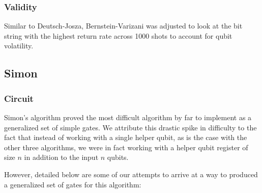 \documentclass[12pt]{article}
\begin{document}
\subsubsection*{Validity}
Similar to Deutsch-Josza, Bernstein-Varizani was adjusted to look at the bit string with the highest return rate across 1000 shots to account for qubit volatility.

\subsection{Simon}

\subsubsection*{Circuit}
Simon's algorithm proved the most difficult algorithm by far to implement as a generalized set of simple gates.
We attribute this drastic spike in difficulty to the fact that instead of working with a single helper qubit, as is the case with the other three algorithms, we were in fact working with a helper qubit register of size $n$ in addition to the input $n$ qubits.

However, detailed below are some of our attempts to arrive at a way to produced a generalized set of gates for this algorithm:
\end{document}
